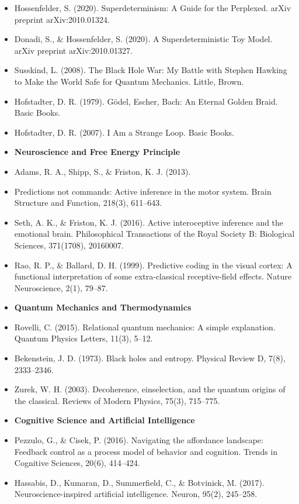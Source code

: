 \begin{itemize}
\item Hossenfelder, S. (2020). Superdeterminism: A Guide for the Perplexed. arXiv preprint arXiv:2010.01324.
\item Donadi, S., \& Hossenfelder, S. (2020). A Superdeterministic Toy Model. arXiv preprint arXiv:2010.01327.
\item Susskind, L. (2008). The Black Hole War: My Battle with Stephen Hawking to Make the World Safe for Quantum Mechanics. Little, Brown.
\item Hofstadter, D. R. (1979). G\"odel, Escher, Bach: An Eternal Golden Braid. Basic Books.
\item Hofstadter, D. R. (2007). I Am a Strange Loop. Basic Books.

\item[] \textbf{Neuroscience and Free Energy Principle}
\item Adams, R. A., Shipp, S., \& Friston, K. J. (2013). 
\item Predictions not commands: Active inference in the motor system. Brain Structure and Function, 218(3), 611--643.
\item Seth, A. K., \& Friston, K. J. (2016). Active interoceptive inference and the emotional brain. Philosophical Transactions of the Royal Society B: Biological Sciences, 371(1708), 20160007.
\item Rao, R. P., \& Ballard, D. H. (1999). Predictive coding in the visual cortex: A functional interpretation of some extra-classical receptive-field effects. Nature Neuroscience, 2(1), 79--87.
\item[] \textbf{Quantum Mechanics and Thermodynamics}
\item Rovelli, C. (2015). Relational quantum mechanics: A simple explanation. Quantum Physics Letters, 11(3), 5--12.
\item Bekenstein, J. D. (1973). Black holes and entropy. Physical Review D, 7(8), 2333--2346.
\item Zurek, W. H. (2003). Decoherence, einselection, and the quantum origins of the classical. Reviews of Modern Physics, 75(3), 715--775.
\item[] \textbf{Cognitive Science and Artificial Intelligence}
\item Pezzulo, G., \& Cisek, P. (2016). Navigating the affordance landscape: Feedback control as a process model of behavior and cognition. Trends in Cognitive Sciences, 20(6), 414--424.
\item Hassabis, D., Kumaran, D., Summerfield, C., \& Botvinick, M. (2017). Neuroscience-inspired artificial intelligence. Neuron, 95(2), 245--258.

\end{itemize}
